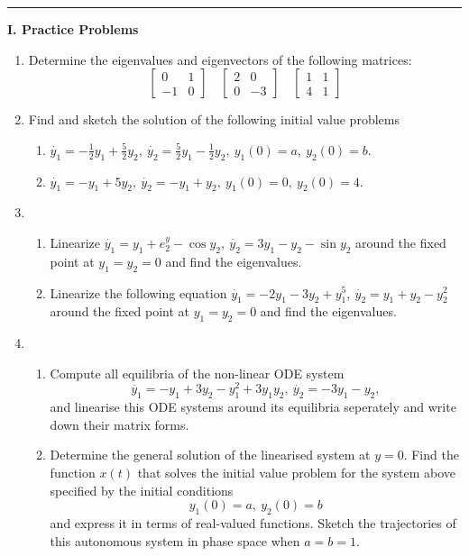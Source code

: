 \documentclass[11pt,a4paper]{article}
\begin{document}
	\rule{\textwidth}{0.4pt}
	\textbf{I. Practice Problems}
	\begin{enumerate}[\bfseries A.]
		\item Determine the eigenvalues and eigenvectors of the following matrices:
		$$
		\begin{bmatrix}
			0 & 1\\
			-1 & 0
		\end{bmatrix}\quad
		\begin{bmatrix}
			2 & 0\\
			0 & -3
		\end{bmatrix}\quad
		\begin{bmatrix}
			1 & 1\\
			4 & 1
		\end{bmatrix}
		$$
		\item Find and sketch the solution of the following initial value problems
		\begin{enumerate}[\bfseries 1)]
			\item $\dot{y_1} = -\frac{1}{2}y_1 + \frac{5}{2}y_2,\ \dot{y_2} = \frac{5}{2}y_1 - \frac{1}{2}y_2,\ y_1(0) = a,\ y_2(0) = b$.
			\item $\dot{y_1} = -y_1 + 5y_2,\ \dot{y_2} = -y_1 + y_2,\ y_1(0) = 0,\ y_2(0) = 4$.
		\end{enumerate}
		\item
		\begin{enumerate}[\bfseries (1)]
			\item Linearize $\dot{y_1} = y_1+e^y_2-\cos y_2,\ \dot{y_2} = 3y_1 - y_2-\sin y_2$ around the fixed point at $y_1 = y_2 = 0$ and find the eigenvalues.
			\item Linearize the following equation $\dot{y_1} = -2y_1 − 3y_2 + y^5_1,\ \dot{y_2} = y_1 + y_2 − y^2_2$ around the fixed point at $y_1 = y_2 = 0$ and find the eigenvalues.
		\end{enumerate}
		\item 
		\begin{enumerate}[\bfseries (1)]
			\item Compute all equilibria of the non-linear ODE system
			$$
			\dot{y_1} = -y_1 + 3y_2 − y^2_1 + 3y_1y_2,\ \dot{y_2} = −3y_1 - y_2,
			$$
			and linearise this ODE systems around its equilibria seperately and write down their matrix forms.
			\item Determine the general solution of the linearised system at $y = 0$. Find the function $x(t)$ that solves the initial value problem for the system above specified by the initial conditions
			$$
			y_1(0) = a,\ y_2(0) = b
			$$
			and express it in terms of real-valued functions. Sketch the trajectories of this autonomous system in phase space when $a = b = 1$.
		\end{enumerate}
	\end{enumerate}
\end{document}
